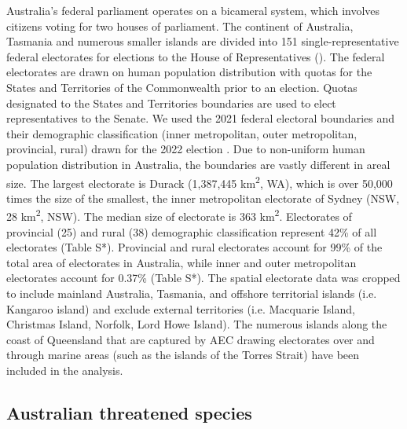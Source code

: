 \documentclass[a4paper,11pt]{article}
\begin{document}
Australia's federal parliament operates on a bicameral system, which involves citizens voting for two houses of parliament. The continent of Australia, Tasmania and numerous smaller islands are divided into 151 single-representative federal electorates for elections to the House of Representatives (\cite{parliamentofaustraliaElectoralDivisions2018}). The federal electorates are drawn on human population distribution with quotas for the States and Territories of the Commonwealth prior to an election. Quotas designated to the States and Territories boundaries are used to elect representatives to the Senate. We used the 2021 federal electoral boundaries and their demographic classification (inner metropolitan, outer metropolitan, provincial, rural) drawn for the 2022 election \cite{australiaelectoralcomissionFederalElectoralBoundaries2019}. Due to non-uniform human population distribution in Australia, the boundaries are vastly different in areal size. The largest electorate is Durack (1,387,445 km\textsuperscript{2}, WA), which is over 50,000 times the size of the smallest, the inner metropolitan electorate of Sydney (NSW, 28 km\textsuperscript{2}, NSW). The median size of electorate is 363 km\textsuperscript{2}. Electorates of provincial (25) and rural (38) demographic classification represent 42\% of all electorates (Table S*). Provincial and rural electorates account for 99\% of the total area of electorates in Australia, while inner and outer metropolitan electorates account for 0.37\% (Table S*). The spatial electorate data was cropped to include mainland Australia, Tasmania, and offshore territorial islands (i.e. Kangaroo island) and exclude external territories (i.e. Macquarie Island, Christmas Island, Norfolk, Lord Howe Island). The numerous islands along the coast of Queensland that are captured by AEC drawing electorates over and through marine areas (such as the islands of the Torres Strait) have been included in the analysis.

\subsection{Australian threatened species}
\end{document}
